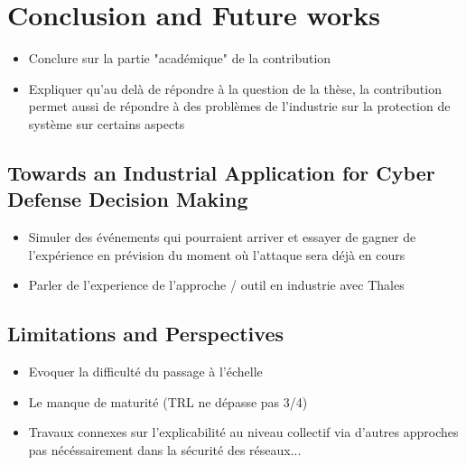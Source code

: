 \chapter{Conclusion and Future works}\label{ch:mathtest} %

\begin{itemize}
    \item Conclure sur la partie "académique" de la contribution
    \item Expliquer qu'au delà de répondre à la question de la thèse, la contribution permet aussi de répondre à des problèmes de l'industrie sur la protection de système sur certains aspects
\end{itemize}

\section{Towards an Industrial Application for Cyber Defense Decision Making}
\begin{itemize}
    \item Simuler des événements qui pourraient arriver et essayer de gagner de l'expérience en prévision du moment où l’attaque sera déjà en cours
    \item Parler de l'experience de l'approche / outil en industrie avec Thales
\end{itemize}

\section{Limitations and Perspectives}
\begin{itemize}
    \item Evoquer la difficulté du passage à l'échelle
    \item Le manque de maturité (TRL ne dépasse pas 3/4)
    \item Travaux connexes sur l'explicabilité au niveau collectif via d'autres approches pas nécéssairement dans la sécurité des réseaux...
\end{itemize}

